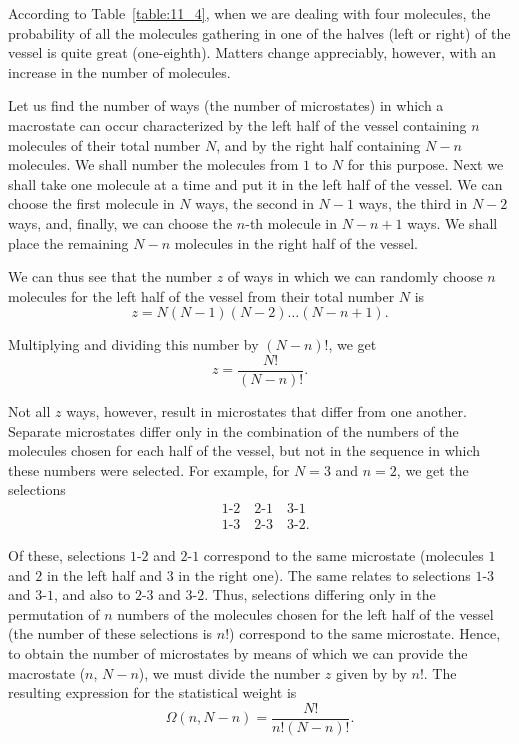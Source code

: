 According to Table~\ref{table:11_4}, when we are dealing with four molecules, the probability of all the molecules gathering in one of the halves (left or right) of the vessel is quite great (one-eighth). Matters change appreciably, however, with an increase in the number of molecules.

Let us find the number of ways (the number of microstates) in which a macrostate can occur characterized by the left half of the vessel containing $n$ molecules of their total number $N$, and by the right half containing $N-n$ molecules. We shall number the molecules from $1$ to $N$ for this purpose. Next we shall take one molecule at a time and put it in the left half of the vessel. We can choose the first molecule in $N$ ways, the second in $N-1$ ways, the third in $N-2$ ways, and, finally, we can choose the $n$-th molecule in $N-n+1$ ways. We shall place the remaining $N-n$ molecules in the right half of the vessel.

We can thus see that the number $z$ of ways in which we can randomly choose $n$ molecules for the left half of the vessel from their total number $N$ is
\begin{equation*}
	z = N(N-1)(N-2)\ldots (N-n+1).
\end{equation*}

\noindent
Multiplying and dividing this number by $(N-n)!$, we get
\begin{equation}\label{eq:11_84}
	z = \frac{N!}{(N-n)!}.
\end{equation}

Not all $z$ ways, however, result in microstates that differ from one another. Separate microstates differ only in the combination of the numbers of the molecules chosen for each half of the vessel, but not in the sequence in which these numbers were selected. For example, for $N=3$ and $n=2$, we get the selections
\begin{align*}
	&\!\! 1\text{-}2\quad 2\text{-}1\quad 3\text{-}1\\
	&\!\! 1\text{-}3\quad 2\text{-}3\quad 3\text{-}2.
\end{align*}

\noindent
Of these, selections $1$-$2$ and $2$-$1$ correspond to the same microstate (molecules $1$ and $2$ in the left half and $3$ in the right one). The same relates to selections $1$-$3$ and $3$-$1$, and also to $2$-$3$ and $3$-$2$. Thus, selections differing only in the permutation of $n$ numbers of the molecules chosen for the left half of the vessel (the number of these selections is $n!$) correspond to the same microstate. Hence, to obtain the number of microstates by means of which we can provide the macrostate ($n$, $N-n$), we must divide the number $z$ given by  by $n!$. The resulting expression for the statistical weight is
\begin{equation}\label{eq:11_85}
	\Omega(n, N-n) = \frac{N!}{n!(N-n)!}.
\end{equation}

